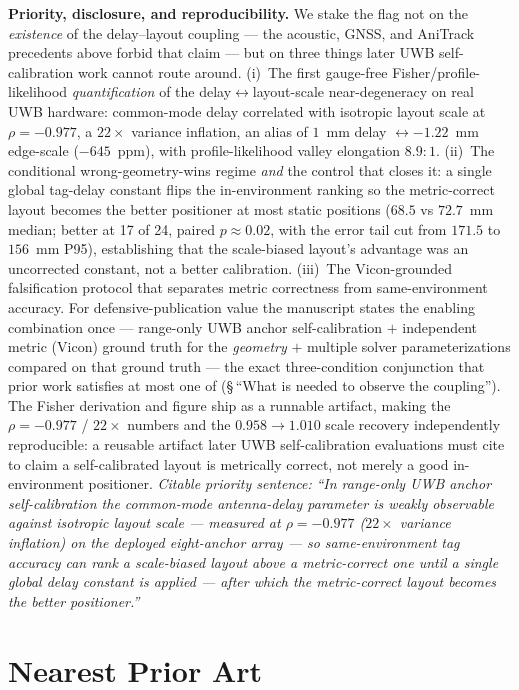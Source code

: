 \documentclass[11pt,a4paper]{article}
\begin{document}
\textbf{Priority, disclosure, and reproducibility.} We stake the flag not on the \emph{existence} of
the delay--layout coupling --- the acoustic, GNSS, and AniTrack precedents above forbid that claim ---
but on three things later UWB self-calibration work cannot route around. (i)~The first gauge-free
Fisher/profile-likelihood \emph{quantification} of the delay$\leftrightarrow$layout-scale
near-degeneracy on real UWB hardware: common-mode delay correlated with isotropic layout scale at
$\rho=-0.977$, a $22\times$ variance inflation, an alias of $1$~mm delay $\leftrightarrow -1.22$~mm
edge-scale ($-645$~ppm), with profile-likelihood valley elongation $8.9{:}1$. (ii)~The conditional
wrong-geometry-wins regime \emph{and} the control that closes it: a single global tag-delay constant
flips the in-environment ranking so the metric-correct layout becomes the better positioner at most
static positions ($68.5$ vs $72.7$~mm median; better at 17 of 24, paired $p\approx0.02$, with the error
tail cut from $171.5$ to $156$~mm P95), establishing
that the scale-biased layout's advantage was an uncorrected constant, not a better calibration.
(iii)~The Vicon-grounded falsification protocol that separates metric correctness from same-environment
accuracy. For defensive-publication value the manuscript states the enabling combination once ---
range-only UWB anchor self-calibration $+$ independent metric (Vicon) ground truth for the
\emph{geometry} $+$ multiple solver parameterizations compared on that ground truth --- the exact
three-condition conjunction that prior work satisfies at most one of (\S\,``What is needed to observe
the coupling''). The Fisher derivation and figure ship as a runnable artifact, making the $\rho=-0.977$ / $22\times$ numbers
and the $0.958\!\to\!1.010$ scale recovery independently reproducible: a reusable artifact later UWB
self-calibration evaluations must cite to claim a self-calibrated layout is metrically correct, not
merely a good in-environment positioner. \emph{Citable priority sentence:}
\emph{``In range-only UWB anchor self-calibration the common-mode antenna-delay parameter is weakly
observable against isotropic layout scale --- measured at $\rho=-0.977$ ($22\times$ variance
inflation) on the deployed eight-anchor array --- so
same-environment tag accuracy can rank a scale-biased layout above a metric-correct one until a single
global delay constant is applied --- after which the metric-correct layout becomes the better positioner.''}

\section{Nearest Prior Art}
\end{document}
